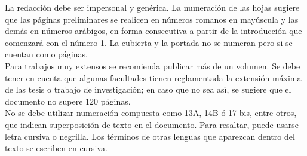 La redacci\'{o}n debe ser impersonal y gen\'{e}rica. La numeraci\'{o}n de las hojas sugiere que las p\'{a}ginas preliminares se realicen en n\'{u}meros romanos en may\'{u}scula y las dem\'{a}s en n\'{u}meros ar\'{a}bigos, en forma consecutiva a partir de la introducci\'{o}n que comenzar\'{a} con el n\'{u}mero 1. La cubierta y la portada no se numeran pero si se cuentan como p\'{a}ginas.\\

Para trabajos muy extensos se recomienda publicar m\'{a}s de un volumen. Se debe tener en cuenta que algunas facultades tienen reglamentada la extensi\'{o}n m\'{a}xima de las tesis  o trabajo de investigaci\'{o}n; en caso que no sea as\'{\i}, se sugiere que el documento no supere 120 p\'{a}ginas.\\

No se debe utilizar numeraci\'{o}n compuesta como 13A, 14B \'{o} 17 bis, entre otros, que indican superposici\'{o}n de texto en el documento. Para resaltar, puede usarse letra cursiva o negrilla. Los t\'{e}rminos de otras lenguas que aparezcan dentro del texto se escriben en cursiva.\\